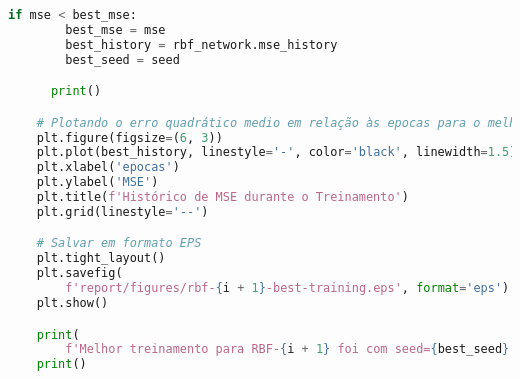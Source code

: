 \begin{lstlisting}[language=Python, caption={Implementação dos experimentos.}]
      if mse < best_mse:
        best_mse = mse
        best_history = rbf_network.mse_history
        best_seed = seed

      print()

    # Plotando o erro quadrático medio em relação às epocas para o melhor treinamento
    plt.figure(figsize=(6, 3))
    plt.plot(best_history, linestyle='-', color='black', linewidth=1.5)
    plt.xlabel('epocas')
    plt.ylabel('MSE')
    plt.title(f'Histórico de MSE durante o Treinamento')
    plt.grid(linestyle='--')

    # Salvar em formato EPS
    plt.tight_layout()
    plt.savefig(
        f'report/figures/rbf-{i + 1}-best-training.eps', format='eps')
    plt.show()

    print(
        f'Melhor treinamento para RBF-{i + 1} foi com seed={best_seed} com MSE={best_mse:.3f}')
    print()
\end{lstlisting}









